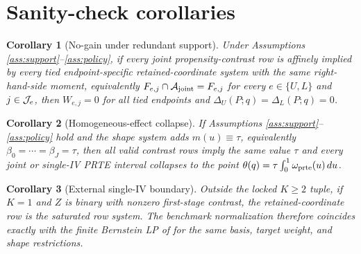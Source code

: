 \documentclass[11pt]{article}
\theoremstyle{definition}
\theoremstyle{plain}
\newtheorem{corollary}{Corollary}
\theoremstyle{remark}
\begin{document}
\section{Sanity-check corollaries}
\begin{corollary}[No-gain under redundant support]\label{cor:no-gain}
Under Assumptions \ref{ass:support}--\ref{ass:policy}, if every joint
propensity-contrast row is affinely implied by every tied endpoint-specific
retained-coordinate system with the same right-hand-side moment, equivalently
\(F_{e,j}\cap{\cal A}_{\rm joint}=F_{e,j}\) for every \(e\in\{U,L\}\) and
\(j\in{\cal J}_e\), then \(W_{e,j}=0\) for all tied endpoints and
\(\Delta_U(P;q)=\Delta_L(P;q)=0\).
\end{corollary}

\begin{corollary}[Homogeneous-effect collapse]\label{cor:homogeneous}
If Assumptions \ref{ass:support}--\ref{ass:policy} hold and the shape system
adds \(m(u)\equiv\tau\), equivalently \(\beta_0=\cdots=\beta_J=\tau\), then
all valid contrast rows imply the same value \(\tau\) and every joint or
single-IV PRTE interval collapses to the point \(\theta(q)=\tau\int_0^1
\omega_{\rm prte}(u)\,du\).
\end{corollary}

\begin{corollary}[External single-IV boundary]\label{cor:k1-boundary}
Outside the locked \(K\ge2\) tuple, if \(K=1\) and \(Z\) is binary with
nonzero first-stage contrast, the retained-coordinate row is the saturated
row system.  The benchmark normalization therefore coincides exactly with the
finite Bernstein LP of \citet{MogstadSantosTorgovitsky2018} for the same
basis, target weight, and shape restrictions.
\end{corollary}
\end{document}
